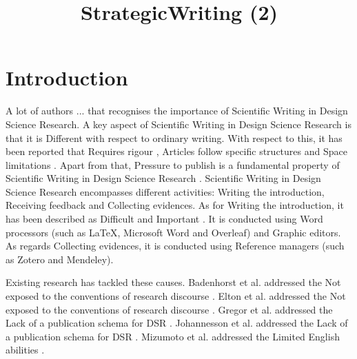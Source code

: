 \documentclass{article}
\title{StrategicWriting (2)}
\author{}
\begin{document}
\maketitle
      

\section{Introduction}

A lot of authors ... that recognises the importance of Scientific Writing in Design Science Research. A key aspect of Scientific Writing in Design Science Research is that it is Different with respect to ordinary writing. With respect to this, it has been reported that Requires rigour \cite{JohannessonAnIntroduction}, Articles follow specific structures \cite{Turbek2016} \cite{JohannessonAnIntroduction} \cite{psychologicalscience.org} \cite{Kanoksilapatham2012} and Space limitations \cite{Gregor2013} \cite{Hsu2004}. Apart from that, Pressure to publish is a fundamental property of Scientific Writing in Design Science Research \cite{CoylarBecomingwriters} \cite{Turbek2016} \cite{Sorensen1994} \cite{Kanoksilapatham2012} \cite{Mizumoto2017} \cite{Cotterall2011}. Scientific Writing in Design Science Research encompasses different activities: Writing the introduction, Receiving feedback and Collecting evidences. As for Writing the introduction, it has been described as Difficult \cite{Hsu2004} \cite{Hsu2004} \cite{Hsu2004} \cite{PeatScientificWriting.} \cite{Cotterall2011} and Important \cite{Gregor2013} \cite{Turbek2016} \cite{Turbek2016} \cite{SwalesTheWriting} \cite{Khaw2017} \cite{Kanoksilapatham2012}. It is conducted using Word processors (such as LaTeX, Microsoft Word and Overleaf) and Graphic editors. As regards Collecting evidences, it is conducted using Reference managers (such as Zotero and Mendeley). 
    

    
Existing research has tackled these causes. Badenhorst et al. addressed the Not exposed to the conventions of research discourse \cite{Badenhorst2015}. Elton et al. addressed the Not exposed to the conventions of research discourse \cite{Elton2010}. Gregor et al. addressed the Lack of a publication schema for DSR \cite{Gregor2013}. Johannesson et al. addressed the Lack of a publication schema for DSR \cite{JohannessonAnIntroduction}. Mizumoto et al. addressed the Limited English abilities \cite{Mizumoto2017}. 
    
\end{document}
